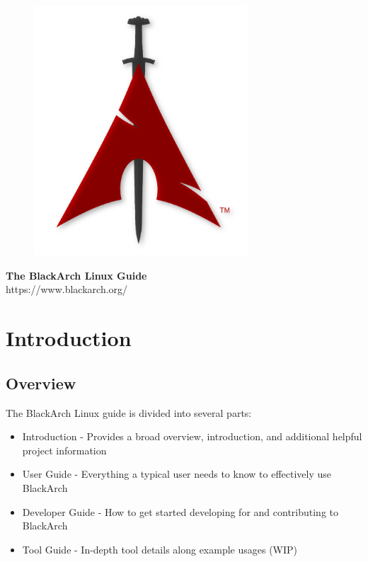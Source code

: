 \documentclass[a4paper, oneside, 11pt]{book}
\begin{document}
\pagestyle{empty}
\begin{center}
\begin{figure}[htbp]
\centering
\vspace{0.5cm}
\includegraphics[width=8cm]{images/logo.png}
\label{fig:logo}
\end{figure}
\vspace{0.5cm}
\Huge{\textbf{The BlackArch Linux Guide}}\\
\vspace{1cm}
\Large{\color{red}https://www.blackarch.org/}\\
\vspace{0.5cm}
\end{center}
\newpage
\tableofcontents
\newpage
\pagestyle{fancy}


\chapter{Introduction}

\section{Overview}
The BlackArch Linux guide is divided into several parts:
\begin{itemize}
\item Introduction - Provides a broad overview, introduction, and additional helpful project information
\item User Guide - Everything a typical user needs to know to effectively use BlackArch
\item Developer Guide - How to get started developing for and contributing to BlackArch
\item Tool Guide - In-depth tool details along example usages (WIP)
\end{itemize}
\end{document}
